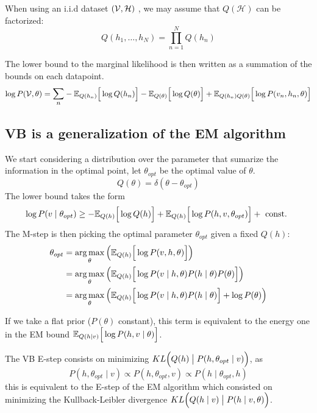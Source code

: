 When using an i.i.d dataset \((\mathcal{V}, \mathcal{H})\) , we may assume that \(Q(\mathcal{H})\) can be factorized:
\[
  Q(h_{1}, \dots, h_{N}) = \prod_{n=1}^{N}Q(h_{n})
\]

The lower bound to the marginal likelihood is then written as a summation of the bounds on each datapoint.
\[
  \log{P(\V, \theta)} = \mathlarger{\sum_{n}} -\E{Q(h_{n})}{\log{Q(h_{n})}}- \E{Q(\theta)}{\log{Q(\theta)}} + \E{Q(h_{n})Q(\theta)}{\log{P(v_{n}, h_{n},\theta)}}
\]

\subsection{VB is a generalization of the EM algorithm}

We start considering a distribution over the parameter that sumarize the information in the optimal point, let \(\theta_{opt}\) be the optimal value of \(\theta\).
\[
  Q(\theta) = \delta(\theta - \theta_{opt})
\]
The lower bound takes the form
\[
  \log{P(v \mid \theta_{opt})} \geq - \mathbb{E}_{Q(h)}\Big[\log{Q(h)}\Big] + \mathbb{E}_{Q(h)}\Big[\log{P(h, v, \theta_{opt})}\Big] + \text{ const. }
\]
The M-step is then picking the optimal parameter \(\theta_{opt}\) given a fixed \(Q(h)\):
\[
  \begin{aligned}
    \theta_{opt} &= \operatorname*{arg\,max}_{\theta} \Big( \mathbb{E}_{Q(h)}\Big[\log{P(v,h,\theta)}\Big] \Big)\\
    &=  \operatorname*{arg\,max}_{\theta} \Big( \mathbb{E}_{Q(h)}\Big[\log{P(v \mid h,\theta)P(h \mid \theta)P(\theta)}\Big] \Big) \\
    &= \operatorname*{arg\,max}_{\theta} \Big( \mathbb{E}_{Q(h)}\Big[\log{P(v \mid h,\theta)P(h \mid \theta)}\Big] + \log{P(\theta)} \Big) \\
  \end{aligned}
\]

If we take a flat prior (\(P(\theta) \)  constant), this term is equivalent to the energy one in the EM bound \(\mathbb{E}_{Q(h\mid v)}\Big[\log{P(h,v \mid \theta)}\Big]\).

The VB E-step consists on minimizing \(KL\Big(Q(h) \bigm| P(h,\theta_{opt} \mid v)\Big)\), as
\[
  P(h, \theta_{opt}\mid v) \propto P(h, \theta_{opt}, v) \propto P(h \mid \theta_{opt}, h)
\]
this is equivalent to the E-step of the EM algorithm which consisted on minimizing the Kullback-Leibler divergence \(KL\Big(Q(h \mid v) \bigm| P(h \mid v, \theta)\Big)\).
